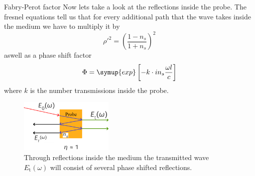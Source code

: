 \documentclass[aspectratio=1610, 9pt]{beamer}
\begin{document}

\begin{frame}{Fabry-Perot factor}
  Now lets take a look at the reflections inside the probe.
  The fresnel equations tell us that for every additional path that the wave takes inside the medium we have to multiply it by 
  \begin{equation}
    \rho'^2 = \left(\frac{1 - n_s}{1 + n_s}\right)^2
  \end{equation}
  aswell as a phase shift factor 
  \begin{equation}
    \Phi = \symup{exp}\left[-k \cdot i n_s \frac{\omega l}{c}\right]
  \end{equation}
  where $k$ is the number transmissions inside the probe.
  \begin{figure}
    \includegraphics[width=0.4\textwidth]{images/Perot.pdf}
    \caption{Through reflections inside the medium the transmitted wave $E_\text{t}(\omega)$ will consist of several phase shifted reflections.}
  \end{figure}
\end{frame}
\end{document}
